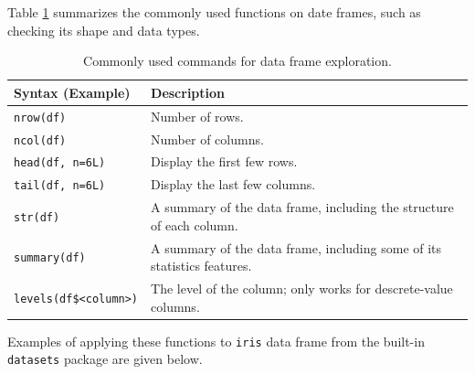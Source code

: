 Table \ref{ch:r1:tab:dataframeexplore} summarizes the commonly used functions on date frames, such as checking its shape and data types.
\begin{table}[!htb]
  \centering \caption{Commonly used commands for data frame exploration.}\label{ch:r1:tab:dataframeexplore}
  \begin{tabularx}{\textwidth}{lX}
    \hline
    Syntax (Example) & Description \\ \hline
    \verb|nrow(df)| & Number of rows. \\
    \verb|ncol(df)| & Number of columns. \\
    \verb|head(df, n=6L)| & Display the first few rows. \\
    \verb|tail(df, n=6L)| & Display the last few columns. \\
    \verb|str(df)| & A summary of the data frame, including the structure of each column. \\
    \verb|summary(df)| & A summary of the data frame, including some of its statistics features. \\
    \verb|levels(df$<column>)| & The level of the column; only works for descrete-value columns. \\
    \hline
  \end{tabularx}
\end{table}
Examples of applying these functions to \verb|iris| data frame from the built-in \verb|datasets| package are given below.
